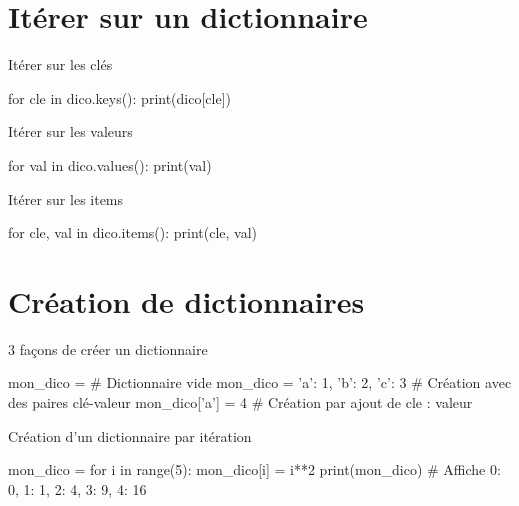 \section{Itérer sur un dictionnaire}


\begin{minipage}{0.31\linewidth}
	\begin{easybox}{Itérer sur les clés}{}
		\begin{CodePythontexAlt}[Largeur=1\linewidth,Centre,Lignes=false,PremLigne=1]{}
	for cle in dico.keys():
		print(dico[cle])
		\end{CodePythontexAlt}
	\end{easybox}
\end{minipage}\hfill
\begin{minipage}{0.33\linewidth}
	\begin{easybox}{Itérer sur les valeurs}{}
		\begin{CodePythontexAlt}[Largeur=1\linewidth,Centre,Lignes=false,PremLigne=1]{}
	for val in dico.values():
		print(val)
		\end{CodePythontexAlt}
	\end{easybox}
\end{minipage}\hfill
\begin{minipage}{0.36\linewidth}
	\begin{easybox}{Itérer sur les items}{}
		\begin{CodePythontexAlt}[Largeur=1\linewidth,Centre,Lignes=false,PremLigne=1]{}
	for cle, val in dico.items():
		print(cle, val)
		\end{CodePythontexAlt}
	\end{easybox}
\end{minipage}

\section{Création de dictionnaires}

\begin{easybox}{3 façons de créer un dictionnaire}{}
	\begin{CodePythontexAlt}[Largeur=1\linewidth,Centre,PremLigne=1]{}
mon_dico = {}					   # Dictionnaire vide
mon_dico = {'a': 1, 'b': 2, 'c': 3} # Création avec des paires clé-valeur
mon_dico['a'] = 4				   # Création par ajout de cle : valeur
\end{CodePythontexAlt}
\end{easybox}

\begin{easybox}{Création d'un dictionnaire par itération}{}
	\begin{CodePythontexAlt}[Largeur=1\linewidth,Centre,PremLigne=1]{}
mon_dico = {}
for i in range(5):
	mon_dico[i] = i**2
print(mon_dico) # Affiche {0: 0, 1: 1, 2: 4, 3: 9, 4: 16}
\end{CodePythontexAlt}
\end{easybox}

